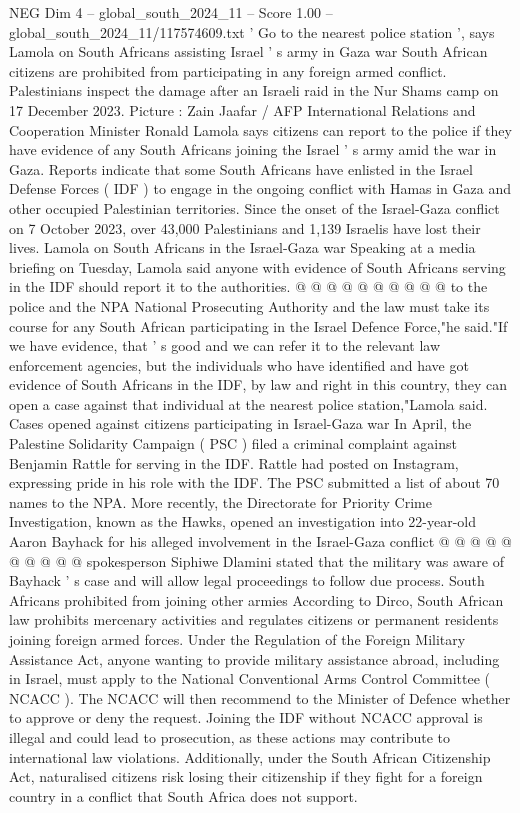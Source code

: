 \begin{textsample}{NEG Dim 4 – global\_south\_2024\_11 – Score 1.00 – global\_south\_2024\_11/117574609.txt}  \label{ex:f4_neg_173}
' Go to the nearest police station ', says Lamola on South Africans assisting Israel ' s army in Gaza war South African citizens are prohibited from participating in any foreign armed conflict.
Palestinians inspect the damage after an Israeli raid in the Nur Shams camp on 17 December 2023.
Picture : Zain Jaafar / AFP International Relations and Cooperation Minister Ronald Lamola says citizens can report to the police if they have evidence of any South Africans joining the Israel ' s army amid the war in Gaza.
Reports indicate that some South Africans have enlisted in the Israel Defense Forces ( IDF ) to engage in the ongoing conflict with Hamas in Gaza and other occupied Palestinian territories.
Since the onset of the Israel-Gaza conflict on 7 October 2023, over 43,000 Palestinians and 1,139 Israelis have lost their lives.
Lamola on South Africans in the Israel-Gaza war Speaking at a media briefing on Tuesday, Lamola said anyone with evidence of South Africans serving in the IDF should report it to the authorities. @ @ @ @ @ @ @ @ @ @ to the police and the NPA National Prosecuting Authority and the law must take its course for any South African participating in the Israel Defence Force,"he said."If we have evidence, that ' s good and we can refer it to the relevant law enforcement agencies, but the individuals who have identified and have got evidence of South Africans in the IDF, by law and right in this country, they can open a case against that individual at the nearest police station,"Lamola said.
Cases opened against citizens participating in Israel-Gaza war In April, the Palestine Solidarity Campaign ( PSC ) filed a criminal complaint against Benjamin Rattle for serving in the IDF.
Rattle had posted on Instagram, expressing pride in his role with the IDF.
The PSC submitted a list of about 70 names to the NPA.
More recently, the Directorate for Priority Crime Investigation, known as the Hawks, opened an investigation into 22-year-old Aaron Bayhack for his alleged involvement in the Israel-Gaza conflict @ @ @ @ @ @ @ @ @ @ spokesperson Siphiwe Dlamini stated that the military was aware of Bayhack ' s case and will allow legal proceedings to follow due process.
South Africans prohibited from joining other armies According to Dirco, South African law prohibits mercenary activities and regulates citizens or permanent residents joining foreign armed forces.
Under the Regulation of the Foreign Military Assistance Act, anyone wanting to provide military assistance abroad, including in Israel, must apply to the National Conventional Arms Control Committee ( NCACC ).
The NCACC will then recommend to the Minister of Defence whether to approve or deny the request.
Joining the IDF without NCACC approval is illegal and could lead to prosecution, as these actions may contribute to international law violations.
Additionally, under the South African Citizenship Act, naturalised citizens risk losing their citizenship if they fight for a foreign country in a conflict that South Africa does not support.

\end{textsample}

